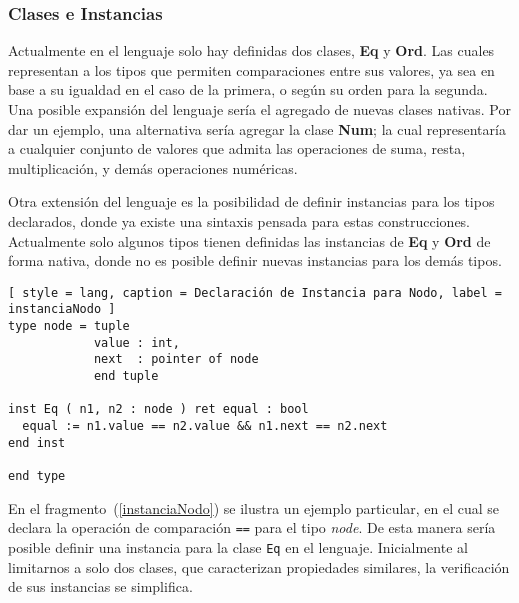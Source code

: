 \subsubsection{Clases e Instancias}

Actualmente en el lenguaje solo hay definidas dos clases, \textbf{Eq} y \textbf{Ord}.
Las cuales representan a los tipos que permiten comparaciones entre sus valores, ya sea en base a su igualdad en el caso de la primera, o según su orden para la segunda.
Una posible expansión del lenguaje sería el agregado de nuevas clases nativas.
Por dar un ejemplo, una alternativa sería agregar la clase \textbf{Num}; la cual representaría a cualquier conjunto de valores que admita las operaciones de suma, resta, multiplicación, y demás operaciones numéricas.

Otra extensión del lenguaje es la posibilidad de definir instancias para los tipos declarados, donde ya existe una sintaxis pensada para estas construcciones.
Actualmente solo algunos tipos tienen definidas las instancias de \textbf{Eq} y \textbf{Ord} de forma nativa, donde no es posible definir nuevas instancias para los demás tipos.

\begin{lstlisting}[ style = lang, caption = Declaración de Instancia para Nodo, label = instanciaNodo ]
type node = tuple
            value : int,
            next  : pointer of node
            end tuple

inst Eq ( n1, n2 : node ) ret equal : bool
  equal := n1.value == n2.value && n1.next == n2.next
end inst

end type
\end{lstlisting}

En el fragmento~(\ref{instanciaNodo}) se ilustra un ejemplo particular, en el cual se declara la operación de comparación \lstinline[style = lang]{==} para el tipo \textit{node}.
De esta manera sería posible definir una instancia para la clase \lstinline[style = lang]{Eq} en el lenguaje.
Inicialmente al limitarnos a solo dos clases, que caracterizan propiedades similares, la verificación de sus instancias se simplifica.

